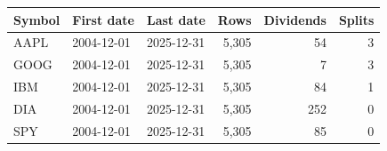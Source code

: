 \begin{tabular}{@{}lllrrr@{}}
\toprule
Symbol & First date & Last date & Rows & Dividends & Splits \\
\midrule
AAPL & 2004-12-01 & 2025-12-31 & 5,305 & 54 & 3 \\
GOOG & 2004-12-01 & 2025-12-31 & 5,305 & 7 & 3 \\
IBM & 2004-12-01 & 2025-12-31 & 5,305 & 84 & 1 \\
DIA & 2004-12-01 & 2025-12-31 & 5,305 & 252 & 0 \\
SPY & 2004-12-01 & 2025-12-31 & 5,305 & 85 & 0 \\
\bottomrule
\end{tabular}
